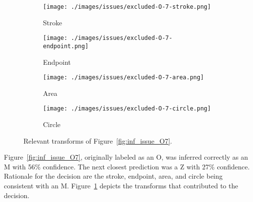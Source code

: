 \begin{figure}[H]
    \centering
    \begin{subfigure}{.20\columnwidth}
        \centering
        \texttt{[image: ./images/issues/excluded-O-7-stroke.png]}
        \caption{Stroke}
    \end{subfigure}%
    \begin{subfigure}{.20\columnwidth}
        \centering
        \texttt{[image: ./images/issues/excluded-O-7-endpoint.png]}
        \caption{Endpoint}
    \end{subfigure}%
    \begin{subfigure}{.20\columnwidth}
        \centering
        \texttt{[image: ./images/issues/excluded-O-7-area.png]}
        \caption{Area}
    \end{subfigure}%
    \begin{subfigure}{.20\columnwidth}
        \centering
        \texttt{[image: ./images/issues/excluded-O-7-circle.png]}
        \caption{Circle}
    \end{subfigure}%
    \caption{Relevant transforms of Figure~\ref{fig:inf_issue_O7}.}
    \label{fig:o7_trans}
\end{figure}

Figure~\ref{fig:inf_issue_O7}, originally labeled as an O, was inferred correctly
as an M with 56\% confidence. The next closest prediction was a Z with 27\%
confidence.  Rationale for the decision are the stroke, endpoint, area,
and circle being consistent with an M. Figure~\ref{fig:o7_trans} depicts the
transforms that contributed to the decision.

